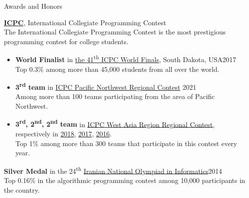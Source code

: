 \documentclass{resume} %
\begin{document}
\begin{rSection}{Awards and Honors}
	
	{\bf \href{http://icpc.baylor.edu/}{ICPC}}, International Collegiate Programming Contest
	\\The International Collegiate Programming Contest is the most prestigious programming 
  contest for college students.
	\smallskip
	\vspace{-0.5em}
	\begin{itemize}[leftmargin=3mm]
		\setlength{\itemsep}{1pt}
		\setlength{\parskip}{1pt}
		\setlength{\parsep}{0pt}
		\renewcommand\labelitemi{$\cdot$}

		\item {\bf World Finalist} in
		\href{https://icpc.global/community/results-2017}{the 41\textsuperscript{th} 
            ICPC World Finals},
		South Dakota, USA\hfill 2017
		\\ Top 0.3\% among more than 45,000 students from all over the world.
		
		\item {\bf 3\textsuperscript{rd} team} in
            \href{http://www.acmicpc-pacnw.org/scoreboard/2020/index1.html}
            {ICPC Pacific Northwest Regional Contest}
		\hfill 2021
		\\ Among more than 100 teams participating from the area of Pacific
    Northwest.

		\item {\bf 3\textsuperscript{rd}, 2\textsuperscript{nd}, 2\textsuperscript{nd} team} in 
      \href{https://icpc.ir/}{ICPC West Asia Region Regional Contest}, respectively in
      \href{http://icpc.sharif.edu/acmicpc18/scoreboard/}{2018},
      \href{http://icpc.sharif.edu/acmicpc17/scoreboard/}{2017},
      \href{http://icpc.sharif.edu/acmicpc16/scoreboard/}{2016}.
		\\ Top 1\% among more than 300 teams that participate in this contest every year.
	\end{itemize}
	
	{\bf Silver Medal} in the 24\textsuperscript{th} \href{http://inoi.ir/}
        {Iranian National Olympiad in Informatics}\hfill 2014
	\smallskip
	\\Top 0.16\% in the algorithmic programming contest among 10,000 participants 
    in the country.

\end{rSection}

\end{document}
